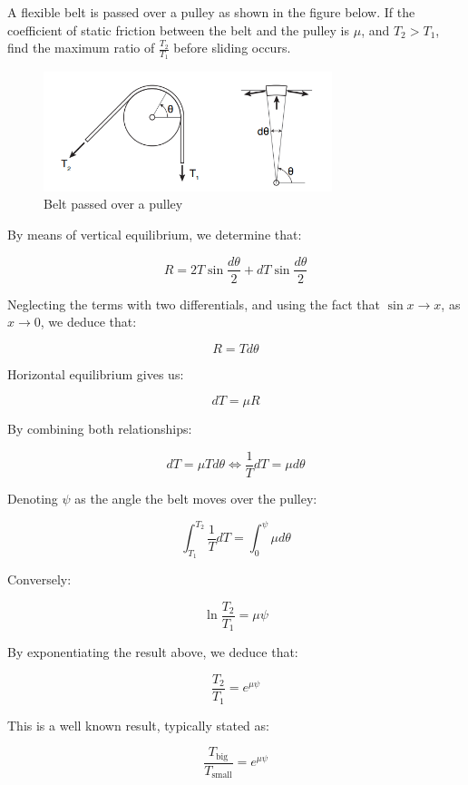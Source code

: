 \documentclass{article}
\begin{document}
\begin{example}
    A flexible belt is passed over a pulley as shown in the figure below. If the coefficient of static friction between the belt and the pulley is $\mu$, and $T_2 > T_1$, find the maximum ratio of $\frac{T_2}{T_1}$ before sliding occurs.

    \begin{figure}[h]
        \centering
        \includegraphics[width = 0.75\textwidth]{images/pulley.png}
        \caption{Belt passed over a pulley}
        \label{fig:pulley}
    \end{figure}

    By means of vertical equilibrium, we determine that:

    \[ R = 2T\sin{\frac{d\theta}{2}} + dT\sin{\frac{d\theta}{2}} \]

    Neglecting the terms with two differentials, and using the fact that $\sin{x} \to x$, as $x \to 0$, we deduce that:

    \[ R = Td\theta \]

    Horizontal equilibrium gives us:

    \[ dT = \mu R \]

    By combining both relationships:

    \[ dT = \mu T d\theta \iff \frac{1}{T} dT = \mu d\theta \]

    Denoting $\psi$ as the angle the belt moves over the pulley:

    \[ \int_{T_1}^{T_2} \frac{1}{T}dT = \int_0^\psi \mu d\theta \]

    Conversely:

    \[ \ln{\frac{T_2}{T_1}} = \mu\psi \]

    By exponentiating the result above, we deduce that:

    \[ \frac{T_2}{T_1} = e^{\mu\psi} \]

    This is a well known result, typically stated as:

    \[ \frac{T_{\text{big}}}{T_{\text{small}}} = e^{\mu\psi} \]
\end{example}
\end{document}
